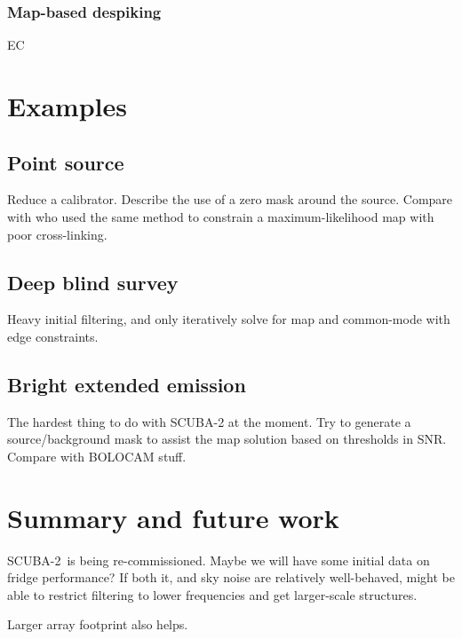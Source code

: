 \documentclass[useAMS,usenatbib,nofootinbib]{mn2e}
\newcommand{\snr}{SNR}
\newcommand{\scuba}{SCUBA-2}
\begin{document}
\subsubsection{Map-based despiking}

EC

\section{Examples}
\label{sec:examples}

\subsection{Point source}
Reduce a calibrator. Describe the use of a zero mask around the
source. Compare with \citet{wiebe2009} who used the same method to
constrain a maximum-likelihood map with poor cross-linking.

\subsection{Deep blind survey}
Heavy initial filtering, and only iteratively solve for map and
common-mode with edge constraints.


\subsection{Bright extended emission}
The hardest thing to do with SCUBA-2 at the moment. Try to generate a
source/background mask to assist the map solution based on thresholds
in \snr. Compare with BOLOCAM stuff.

\section{Summary and future work}
\label{sec:summary}

\scuba\ is being re-commissioned. Maybe we will have some initial data
on fridge performance? If both it, and sky noise are relatively
well-behaved, might be able to restrict filtering to lower frequencies
and get larger-scale structures.

Larger array footprint also helps.
\end{document}
